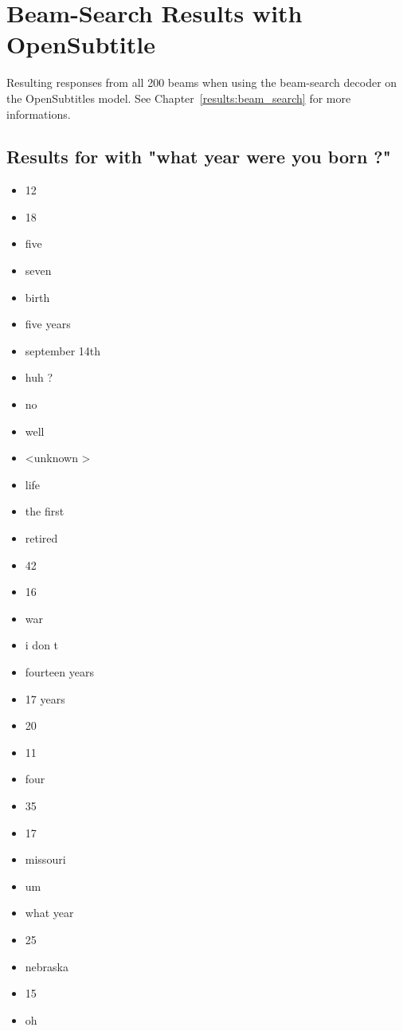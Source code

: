 \chapter{Beam-Search Results with OpenSubtitle}
\label{apendix:results:Beam-search-200:OpenSubtitle}
Resulting responses from all 200 beams when using the beam-search decoder on the OpenSubtitles model. See Chapter~\ref{results:beam_search} for more informations.

\section{Results for with "what year were you born ?"}
\label{apendix:result1:Beam-search-200:OpenSubtitle}
\begin{multicols}{4}
	\begin{itemize}[noitemsep]
		\item 12
		\item 18
		\item five
		\item seven
		\item birth
		\item five years
		\item september 14th
		\item huh ?
		\item no
		\item well
		\item \textless unknown \textgreater
		\item life
		\item the first
		\item retired
		\item 42
		\item 16
		\item war
		\item i don t
		\item fourteen years
		\item 17 years
		\item 20
		\item 11
		\item four
		\item 35
		\item 17
		\item missouri
		\item um
		\item what year
		\item 25
		\item nebraska
		\item 15
		\item oh

\end{itemize}
\end{multicols}
